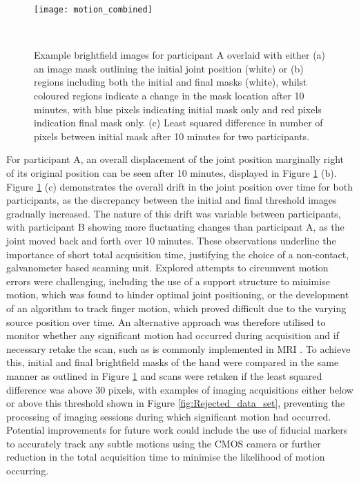 \documentclass[twoside]{bhamthesis}
\theoremstyle{definition}
\begin{document}
\begin{figure}[!ht]
\texttt{[image: motion\_combined]}
\centering
\caption{Example brightfield images for participant A overlaid with either (a) an image mask outlining the initial joint position (white) or (b) regions including both the initial and final masks (white), whilst coloured regions indicate a change in the mask location after 10 minutes, with blue pixels indicating initial mask only and red pixels indication final mask only. (c) Least squared difference in number of pixels between initial mask after 10 minutes for two participants.}
  \label{fig:Motion_masks}\
\end{figure}

For participant A, an overall displacement of the joint position marginally right of its original position can be seen after 10 minutes, displayed in Figure \ref{fig:Motion_masks} (b). Figure \ref{fig:Motion_masks} (c) demonstrates the overall drift in the joint position over time for both participants, as the discrepancy between the initial and final threshold images gradually increased. The nature of this drift was variable between participants, with participant B showing more fluctuating changes than participant A, as the joint moved back and forth over 10 minutes. These observations underline the importance of short total acquisition time, justifying the choice of a non-contact, galvanometer based scanning unit. Explored attempts to circumvent motion errors were challenging, including the use of a support structure to minimise motion, which was found to hinder optimal joint positioning, or the development of an algorithm to track finger motion, which proved difficult due to the varying source position over time. An alternative approach was therefore utilised to monitor whether any significant motion had occurred during acquisition and if necessary retake the scan, such as is commonly implemented in MRI \cite{dosenbach2017real}. To achieve this, initial and final brightfield masks of the hand were compared in the same manner as outlined in Figure \ref{fig:Motion_masks} and scans were retaken if the least squared difference was above 30 pixels, with examples of imaging acquisitions either below or above this threshold shown in Figure \ref{fig:Rejected_data_set}, preventing the processing of imaging sessions during which significant motion had occurred. Potential improvements for future work could include the use of fiducial markers to accurately track any subtle motions using the CMOS camera or further reduction in the total acquisition time to minimise the likelihood of motion occurring. 
\end{document}
